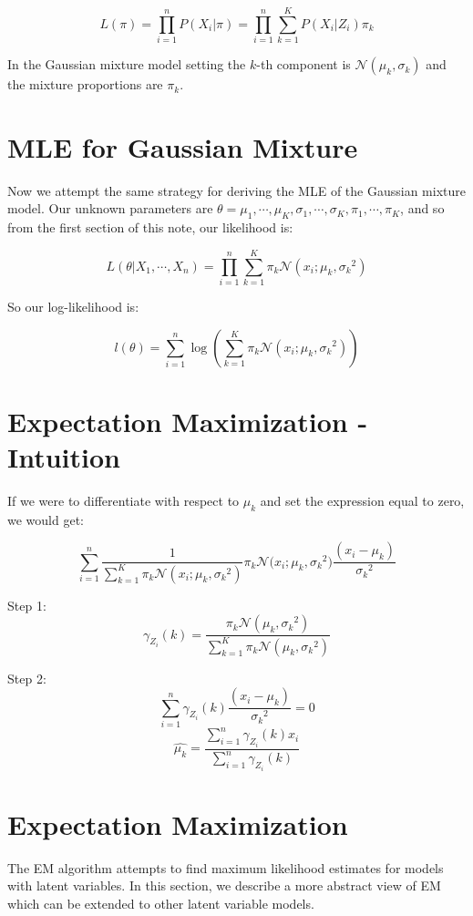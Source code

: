 \documentclass{article}
\begin{document}
\[
L(\pi) = \prod_{i=1}^{n} P(X_i | \pi) = \prod_{i=1}^{n} \sum_{k=1}^{K} P(X_i | Z_i) \pi_k
\]

In the Gaussian mixture model setting the $k$-th component is $\mathcal{N}(\mu_k,\sigma_k)$ and the mixture proportions are $\pi_k$.

\section{MLE for Gaussian Mixture}

Now we attempt the same strategy for deriving the MLE of the Gaussian mixture model. Our unknown parameters are $\theta={\mu_1,\cdots,\mu_K,\sigma_1,\cdots,\sigma_K,\pi_1,\cdots,\pi_K}$, and so from the first section of this note, our likelihood is:

\[
L(\theta | X_1, \cdots ,X_n) =  \prod_{i=1}^{n} \sum_{k=1}^{K}  \pi_k \mathcal{N} (x_i ; \mu_k, {\sigma_k}^2)
\]

So our log-likelihood is:

\[
l(\theta) = \sum_{i=1}^{n} \log \left( \sum_{k=1}^{K}  \pi_k \mathcal{N} (x_i ; \mu_k, {\sigma_k}^2) \right)
\]

\section{Expectation Maximization - Intuition}
If we were to differentiate with respect to $\mu_k$ and set the expression equal to zero, we would get:

\[
\sum_{i=1}^{n} \frac{1}{\sum_{k=1}^{K}  \pi_k \mathcal{N} (x_i ; \mu_k, {\sigma_k}^2)} {\pi_k \mathcal{N} (x_i ; \mu_k, {\sigma_k}^2}) \frac{\left(x_i - \mu_k\right)}{{\sigma_k}^2}
\]


Step 1:\\
\[
\gamma_{Z_i} (k) =  \frac{\pi_k \mathcal{N} (\mu_k, {\sigma_k}^2)}{\sum_{k=1}^{K}  \pi_k \mathcal{N} (\mu_k, {\sigma_k}^2)} {}
\]

Step 2:\\
\[
\sum_{i=1}^{n} \gamma_{Z_i} (k) \frac{\left(x_i - \mu_k\right)}{{\sigma_k}^2} = 0
\]
\[
\hat{\mu_k} = \frac{\sum_{i=1}^{n} \gamma_{Z_i} (k) x_i}{\sum_{i=1}^{n} \gamma_{Z_i} (k)}
\]



\section{Expectation Maximization}
The EM algorithm attempts to find maximum likelihood estimates for models with latent variables. In this section, we describe a more abstract view of EM which can be extended to other latent variable models.
\end{document}
